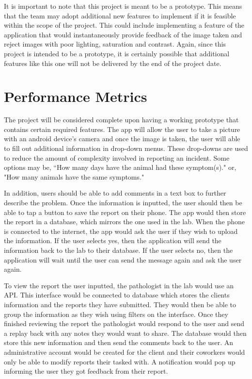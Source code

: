 \documentclass[onecolumn, draftclsnofoot,10pt, compsoc]{IEEEtran}
\begin{document}
It is important to note that this project is meant to be a prototype. This means that the team may adopt additional new features to implement if it is feasible within the scope of the project. This could include implementing a feature of the application that would instantaneously provide feedback of the image taken and reject images with poor lighting, saturation and contrast. Again, since this project is intended to be a prototype, it is certainly possible that additional features like this one will not be delivered by the end of the project date.


\section{Performance Metrics}
	The project will be considered complete upon having a working prototype that contains certain required features.
    The app will allow the user to take a picture with an android device's camera and once the image is taken, the user will able to fill out additional information in drop-down menus.
	These drop-downs are used to reduce the amount of complexity involved in reporting an incident.
	Some options may be, “How many days have the animal had these symptom(s)." or, "How many animals have the same symptoms."
    
	In addition, users should be able to add comments in a text box to further describe the problem.
	Once the information is inputted, the user should then be able to tap a button to save the report on their phone.
    The app would then store the report in a database, which mirrors the one used in the lab.
	When the phone is connected to the internet, the app would ask the user if they wish to upload the information.
	If the user selects yes, then the application will send the information back to the lab to their database.
   	If the user selects no, then the application will wait until the user can send the message again and ask the user again. 
	
	To view the report the user inputted, the pathologist in the lab would use an API.
	This interface would be connected to database which stores the clients information and the reports they have submitted.
	They would then be able to group the information as they wish using filters on the interface.
    Once they finished reviewing the report the pathologist would respond to the user and send a replay back with any notes they would want to share.
    The database would then store this new information and then send the comments back to the user.
    An administrative account would be created for the client and their coworkers would only be able to modify reports their tasked with.  
    A notification would pop up informing the user they got feedback from their report.
   
 
\end{document}
